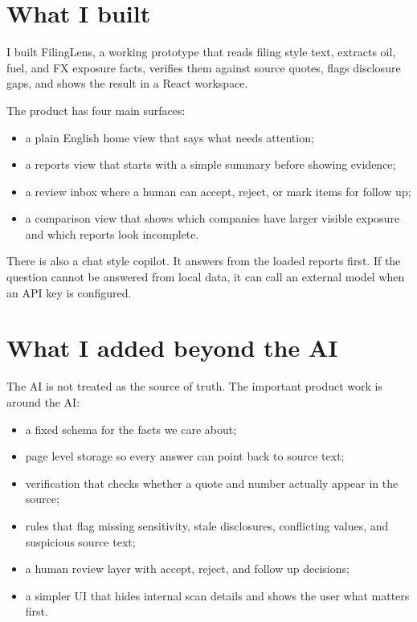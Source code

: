 \documentclass[10pt]{article}
\begin{document}
\section{What I built}

I built FilingLens, a working prototype that reads filing style text, extracts oil, fuel, and FX exposure facts, verifies them against source quotes, flags disclosure gaps, and shows the result in a React workspace.

The product has four main surfaces:
\begin{itemize}
  \item a plain English home view that says what needs attention;
  \item a reports view that starts with a simple summary before showing evidence;
  \item a review inbox where a human can accept, reject, or mark items for follow up;
  \item a comparison view that shows which companies have larger visible exposure and which reports look incomplete.
\end{itemize}

There is also a chat style copilot. It answers from the loaded reports first. If the question cannot be answered from local data, it can call an external model when an API key is configured.

\section{What I added beyond the AI}

The AI is not treated as the source of truth. The important product work is around the AI:
\begin{itemize}
  \item a fixed schema for the facts we care about;
  \item page level storage so every answer can point back to source text;
  \item verification that checks whether a quote and number actually appear in the source;
  \item rules that flag missing sensitivity, stale disclosures, conflicting values, and suspicious source text;
  \item a human review layer with accept, reject, and follow up decisions;
  \item a simpler UI that hides internal scan details and shows the user what matters first.
\end{itemize}
\end{document}
